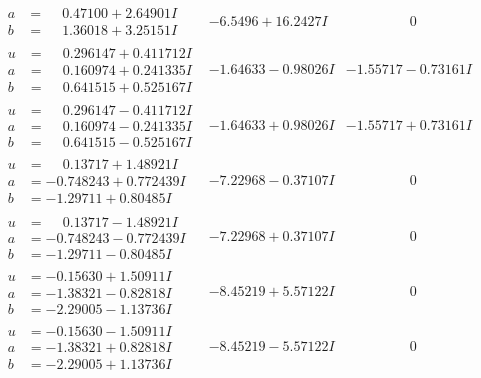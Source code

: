 \documentclass[1p]{elsarticle_modified}
\theoremstyle{definition}
\begin{document}
$$\begin{array}{c|c|c}
\begin{aligned}
a &= \phantom{-}0.47100 + 2.64901 I \\
b &= \phantom{-}1.36018 + 3.25151 I\end{aligned}
 & -6.5496 + 16.2427 I & \phantom{-0.000000 } 0 \\ \hline\begin{aligned}
u &= \phantom{-}0.296147 + 0.411712 I \\
a &= \phantom{-}0.160974 + 0.241335 I \\
b &= \phantom{-}0.641515 + 0.525167 I\end{aligned}
 & -1.64633 - 0.98026 I & -1.55717 - 0.73161 I \\ \hline\begin{aligned}
u &= \phantom{-}0.296147 - 0.411712 I \\
a &= \phantom{-}0.160974 - 0.241335 I \\
b &= \phantom{-}0.641515 - 0.525167 I\end{aligned}
 & -1.64633 + 0.98026 I & -1.55717 + 0.73161 I \\ \hline\begin{aligned}
u &= \phantom{-}0.13717 + 1.48921 I \\
a &= -0.748243 + 0.772439 I \\
b &= -1.29711 + 0.80485 I\end{aligned}
 & -7.22968 - 0.37107 I & \phantom{-0.000000 } 0 \\ \hline\begin{aligned}
u &= \phantom{-}0.13717 - 1.48921 I \\
a &= -0.748243 - 0.772439 I \\
b &= -1.29711 - 0.80485 I\end{aligned}
 & -7.22968 + 0.37107 I & \phantom{-0.000000 } 0 \\ \hline\begin{aligned}
u &= -0.15630 + 1.50911 I \\
a &= -1.38321 - 0.82818 I \\
b &= -2.29005 - 1.13736 I\end{aligned}
 & -8.45219 + 5.57122 I & \phantom{-0.000000 } 0 \\ \hline\begin{aligned}
u &= -0.15630 - 1.50911 I \\
a &= -1.38321 + 0.82818 I \\
b &= -2.29005 + 1.13736 I\end{aligned}
 & -8.45219 - 5.57122 I & \phantom{-0.000000 } 0 \\ \hline\begin{aligned}

\end{aligned}
\end{array}$$
\end{document}
